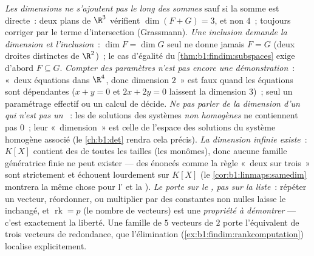 \begin{remark}
\label{rem:b1:findim:pitfalls}
\emph{Les dimensions ne s'ajoutent pas le long des sommes} sauf si la
somme est directe~: deux plans de $\R^3$ vérifient $\dim(F + G) = 3$,
et non $4$~; toujours corriger par le terme d'intersection
(Grassmann).
\emph{Une inclusion demande la dimension \emph{et} l'inclusion}~:
$\dim F = \dim G$ seul ne donne jamais $F = G$ (deux droites
distinctes de $\R^2$)~; le cas d'égalité du
\cref{thm:b1:findim:subspaces} exige d'abord $F \subseteq G$.
\emph{Compter des paramètres n'est pas encore une démonstration}~:
«~deux équations dans $\R^4$, donc dimension $2$~» est faux quand les
équations sont dépendantes ($x + y = 0$ et $2x + 2y = 0$ laissent la
dimension $3$)~; seul un paramétrage effectif ou un calcul de 
décide.
\emph{Ne pas parler de la dimension d'un  qui n'est pas un
}~: les  de solutions des systèmes
\emph{non homogènes} ne contiennent pas $0$~; leur «~dimension~» est
celle de l'espace des solutions du système homogène associé
(le \cref{ch:b1:det} rendra cela précis).
\emph{La dimension infinie existe}~: $K[X]$ contient des  de toutes les tailles (les monômes), donc aucune famille
génératrice finie ne peut exister --- des énoncés comme la règle
«~deux sur trois~» sont strictement  et échouent
lourdement sur $K[X]$
(le \cref{cor:b1:linmaps:samedim} montrera la même chose pour
l' et la ).
\emph{Le  porte sur le , pas sur la liste}~:
répéter un vecteur, réordonner, ou multiplier par des constantes non
nulles laisse le  inchangé, et $\operatorname{rk} = p$ (le nombre
de vecteurs) est une \emph{propriété à démontrer} --- c'est
exactement la liberté. Une famille de $5$ vecteurs de  $2$ porte
l'équivalent de trois vecteurs de redondance, que l'élimination
(\cref{ex:b1:findim:rankcomputation}) localise explicitement.
\end{remark}

